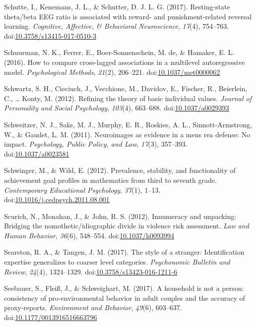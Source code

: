 \documentclass[english,man]{apa6}
\theoremstyle{definition}
\theoremstyle{definition}
\theoremstyle{definition}
\theoremstyle{remark}
\begin{document}
\hypertarget{ref-Schutte2017}{}
Schutte, I., Kenemans, J. L., \& Schutter, D. J. L. G. (2017).
Resting-state theta/beta EEG ratio is associated with reward- and
punishment-related reversal learning. \emph{Cognitive, Affective, \&
Behavioral Neuroscience}, \emph{17}(4), 754--763.
doi:\href{https://doi.org/10.3758/s13415-017-0510-3}{10.3758/s13415-017-0510-3}

\hypertarget{ref-Schuurman2016}{}
Schuurman, N. K., Ferrer, E., Boer-Sonnenschein, M. de, \& Hamaker, E.
L. (2016). How to compare cross-lagged associations in a multilevel
autoregressive model. \emph{Psychological Methods}, \emph{21}(2),
206--221.
doi:\href{https://doi.org/10.1037/met0000062}{10.1037/met0000062}

\hypertarget{ref-Schwartz}{}
Schwartz, S. H., Cieciuch, J., Vecchione, M., Davidov, E., Fischer, R.,
Beierlein, C., \ldots{} Konty, M. (2012). Refining the theory of basic
individual values. \emph{Journal of Personality and Social Psychology},
\emph{103}(4), 663--688.
doi:\href{https://doi.org/10.1037/a0029393}{10.1037/a0029393}

\hypertarget{ref-Schweitzer2011}{}
Schweitzer, N. J., Saks, M. J., Murphy, E. R., Roskies, A. L.,
Sinnott-Armstrong, W., \& Gaudet, L. M. (2011). Neuroimages as evidence
in a mens rea defense: No impact. \emph{Psychology, Public Policy, and
Law}, \emph{17}(3), 357--393.
doi:\href{https://doi.org/10.1037/a0023581}{10.1037/a0023581}

\hypertarget{ref-Schwinger2012}{}
Schwinger, M., \& Wild, E. (2012). Prevalence, stability, and
functionality of achievement goal profiles in mathematics from third to
seventh grade. \emph{Contemporary Educational Psychology}, \emph{37}(1),
1--13.
doi:\href{https://doi.org/10.1016/j.cedpsych.2011.08.001}{10.1016/j.cedpsych.2011.08.001}

\hypertarget{ref-Scurich2012}{}
Scurich, N., Monahan, J., \& John, R. S. (2012). Innumeracy and
unpacking: Bridging the nomothetic/idiographic divide in violence risk
assessment. \emph{Law and Human Behavior}, \emph{36}(6), 548--554.
doi:\href{https://doi.org/10.1037/h0093994}{10.1037/h0093994}

\hypertarget{ref-Searston2016}{}
Searston, R. A., \& Tangen, J. M. (2017). The style of a stranger:
Identification expertise generalizes to coarser level categories.
\emph{Psychonomic Bulletin and Review}, \emph{24}(4), 1324--1329.
doi:\href{https://doi.org/10.3758/s13423-016-1211-6}{10.3758/s13423-016-1211-6}

\hypertarget{ref-Seebauer2017}{}
Seebauer, S., Fleiß, J., \& Schweighart, M. (2017). A household is not a
person: consistency of pro-environmental behavior in adult couples and
the accuracy of proxy-reports. \emph{Environment and Behavior},
\emph{49}(6), 603--637.
doi:\href{https://doi.org/10.1177/0013916516663796}{10.1177/0013916516663796}
\end{document}

